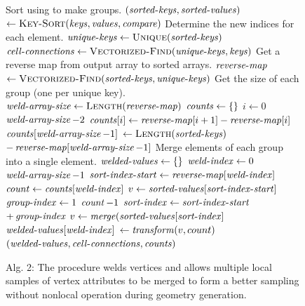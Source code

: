\documentclass[review,journal]{vgtc}         %
\begin{document}
\noindent
\begin{figure}
\vspace{-.32cm}
\begin{codebox}
  \zi \Comment Sort  using  to make groups.
  \li $(\id{sorted-keys},\id{sorted-values})$
  \zi \>\> $\gets \proc{Key-Sort}(\id{keys},\id{values},\id{compare})$
  \zi \Comment Determine the new indices for each element.
  \li $\id{unique-keys} \gets \proc{Unique}(\id{sorted-keys})$
  \li $\id{cell-connections} \gets \proc{Vectorized-Find}(\id{unique-keys},\id{keys})$
  \zi \Comment Get a reverse map from output array to sorted arrays.
  \li $\id{reverse-map}$
  \zi \>\> $\gets \proc{Vectorized-Find}(\id{sorted-keys},\id{unique-keys})$
  \zi \Comment Get the size of each group (one per unique key).
  \li $\id{weld-array-size} \gets \proc{Length}(\id{reverse-map})$
  \li $\id{counts} \gets \{ \}$
  \li \For $i \gets 0$ \To $\id{weld-array-size} - 2$
  \zi \Do {}
  \li     $\id{counts}[i] \gets \id{reverse-map}[i+1] - \id{reverse-map}[i]$
      \End
  \li $\id{counts}[\id{weld-array-size}-1]$
  \zi \>\> $\gets \proc{Length}(\id{sorted-keys})$
  \zi \>\>\> $ - \id{reverse-map}[\id{weld-array-size}-1]$
  \zi \Comment Merge elements of each group into a single element.
  \li $\id{welded-values} \gets \{ \}$
  \li \For $\id{weld-index} \gets 0$ \To $\id{weld-array-size} - 1$
  \zi \Do {}
  \li     $\id{sort-index-start} \gets \id{reverse-map}[\id{weld-index}]$
  \li     $\id{count} \gets \id{counts}[\id{weld-index}]$
  \li     $v \gets \id{sorted-values}[\id{sort-index-start}]$
  \li     \For $\id{group-index} \gets 1$ \To $\id{count} - 1$
  \zi     \Do
  \li         $\id{sort-index} \gets \id{sort-index-start}$
  \zi         \>\>\>\> $+ \id{group-index}$
  \li         $v \gets \id{merge}(\id{sorted-values}[\id{sort-index}]$
          \End
  \li     $\id{welded-values}[\id{weld-index}]$
  \zi     \>\> $\gets \id{transform}(v, count)$
      \End
  \li \Return $(\id{welded-values}, \id{cell-connections}, \id{counts})$
\end{codebox}
\vspace{-0.47cm}
\caption*{Alg. 2: The  procedure welds vertices and allows multiple local samples of vertex attributes to be merged to form a better sampling without nonlocal operation during geometry generation.}
\end{figure}
\end{document}
